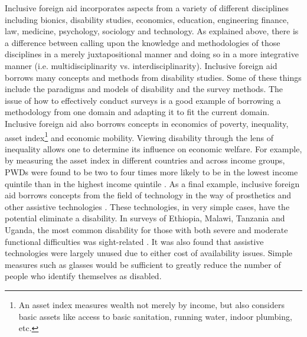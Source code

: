\documentclass[a4paper]{article}
\begin{document}
Inclusive foreign aid incorporates aspects from a variety of different
disciplines including bionics, disability studies, economics, education,
engineering finance, law, medicine, psychology, sociology and technology. As
explained above, there is a difference between calling upon the knowledge and
methodologies of those disciplines in a merely juxtapositional manner and
doing so in a more integrative manner (i.e. multidisciplinarity vs.
interdisciplinarity). Inclusive foreign aid borrows many concepts and methods
from disability studies. Some of these things include the paradigms and models
of disability and the survey methods. The issue of how to effectively conduct
surveys is a good example of borrowing a methodology from one domain and
adapting it to fit the current domain. Inclusive foreign aid also borrows
concepts in economics of poverty, inequality, asset index\footnote{An asset
    index measures wealth not merely by income, but also considers basic
assets like access to basic sanitation, running water, indoor plumbing, etc.}
and economic mobility. Viewing disability through the lens of inequality
allows one to determine its influence on economic welfare. For example, by
measuring the asset index in different countries and across income groups,
PWDs were found to be two to four times more likely to be in the lowest income
quintile than in the highest income quintile \citep{mitra2018disability}. As a
final example, inclusive foreign aid borrows concepts from the field of
technology in the way of prosthetics and other assistive technologies
\citep{roulstone2016disability}. These technologies, in very simple cases,
have the potential eliminate a disability. In surveys of Ethiopia, Malawi,
Tanzania and Uganda, the most common disability for those with both severe and
moderate functional difficulties was sight-related
\citep{mitra2018disability}. It was also found that assistive technologies
were largely unused due to either cost of availability issues. Simple measures
such as glasses would be sufficient to greatly reduce the number of people who
identify themselves as disabled.



\end{document}
